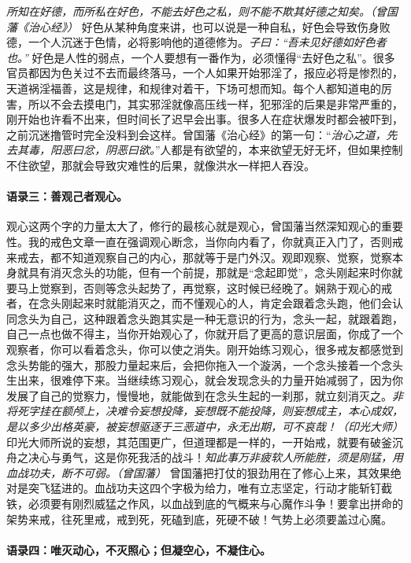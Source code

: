 \textit{所知在好德，而所私在好色，不能去好色之私，则不能不欺其好德之知矣。（曾国藩《治心经》）} 好色从某种角度来讲，也可以说是一种自私，好色会导致伤身败德，一个人沉迷于色情，必将影响他的道德修为。\textit{子曰：“吾未见好德如好色者也。”} 好色是人性的弱点，一个人要想有一番作为，必须懂得“去好色之私”。很多官员都因为色关过不去而最终落马，一个人如果开始邪淫了，报应必将是惨烈的，天道祸淫福善，这是规律，和规律对着干，下场可想而知。每个人都知道电的厉害，所以不会去摸电门，其实邪淫就像高压线一样，犯邪淫的后果是非常严重的，刚开始也许看不出来，但时间长了迟早会出事。很多人在症状爆发时都会被吓到，之前沉迷撸管时完全没料到会这样。曾国藩《治心经》的第一句：“\textit{治心之道，先去其毒，阳恶曰忿，阴恶曰欲。}”人都是有欲望的，本来欲望无好无坏，但如果控制不住欲望，那就会导致灾难性的后果，就像洪水一样把人吞没。

\paragraph{语录三：善观己者观心。}

观心这两个字的力量太大了，修行的最核心就是观心，曾国藩当然深知观心的重要性。我的戒色文章一直在强调观心断念，当你向内看了，你就真正入门了，否则戒来戒去，都不知道观察自己的内心，那就等于是门外汉。观即观察、觉察，觉察本身就具有消灭念头的功能，但有一个前提，那就是“念起即觉”，念头刚起来时你就要马上觉察到，否则等念头起势了，再觉察，这时候已经晚了。娴熟于观心的戒者，在念头刚起来时就能消灭之，而不懂观心的人，肯定会跟着念头跑，他们会认同念头为自己，这种跟着念头跑其实是一种无意识的行为，念头一起，就跟着跑，自己一点也做不得主，当你开始观心了，你就开启了更高的意识层面，你成了一个观察者，你可以看着念头，你可以使之消失。刚开始练习观心，很多戒友都感觉到念头势能的强大，那股力量起来后，会把你拖入一个漩涡，一个念头接着一个念头生出来，很难停下来。当继续练习观心，就会发现念头的力量开始减弱了，因为你发展了自己的觉察力，慢慢地，就能做到在念头生起的一刹那，就立刻消灭之。\textit{非将死字挂在额颅上，决难令妄想投降，妄想既不能投降，则妄想成主，本心成奴，是以多少出格英豪，被妄想驱逐于三恶道中，永无出期，可不哀哉！（印光大师）} 印光大师所说的妄想，其范围更广，但道理都是一样的，一开始戒，就要有破釜沉舟之决心与勇气，这是你死我活的战斗！\textit{知此事万非疲软人所能胜，须是刚猛，用血战功夫，断不可弱。（曾国藩）} 曾国藩把打仗的狠劲用在了修心上来，其效果绝对是突飞猛进的。血战功夫这四个字极为给力，唯有立志坚定，行动才能斩钉截铁，必须要有刚烈威猛之作风，以血战到底的气概来与心魔作斗争！要拿出拼命的架势来戒，往死里戒，戒到死，死磕到底，死硬不破！气势上必须要盖过心魔。

\paragraph{语录四：唯灭动心，不灭照心；但凝空心，不凝住心。}

